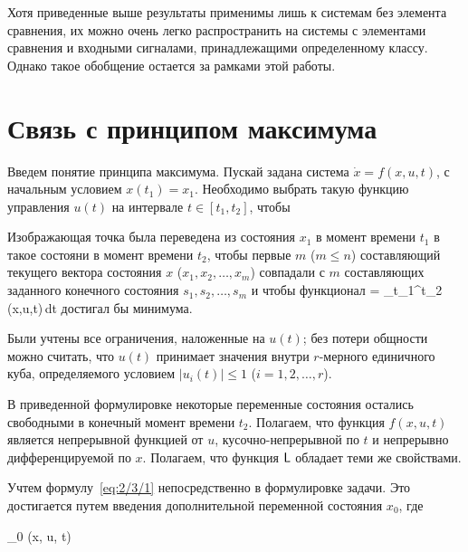 \br

Хотя приведенные выше результаты применимы лишь к системам без элемента сравнения, их можно очень легко распространить на системы с элементами сравнения и входными сигналами, принадлежащими определенному классу. Однако такое обобщение остается за рамками этой работы.



\section{Связь с принципом максимума}




Введем понятие принципа максимума. Пускай задана система $\dot{x} = f(x, u, t)$, с начальным условием $x(t_1) = x_1$. Необходимо выбрать такую функцию управления $u(t)$ на интервале $t \in [t_1, t_2]$, чтобы

\benum
	\item
		Изображающая точка была переведена из состояния $x_1$ в момент времени $t_1$ в такое состояни в момент времени $t_2$, чтобы первые $m$ ($m \leqslant n$) составляющий текущего вектора состояния $x$ ($x_1, x_2, \ldots, x_m$) совпадали с $m$ составляющих заданного конечного состояния $s_1, s_2, \ldots, s_m$ и чтобы функционал
			\funcF = \int\limits_{t_1}^{t_2} \funcL(x,u,t)\,dt
		\eeq
		достигал бы минимума.
		
	\item
		Были учтены все ограничения, наложенные на $u(t)$; без потери общности можно считать, что $u(t)$ принимает значения внутри $r$-мерного единичного куба, определяемого условием $|u_i(t)| \leqslant 1$ ($i = 1,2,\ldots,r$).
\eenum

В приведенной формулировке некоторые переменные состояния остались свободными в конечный момент времени $t_2$. Полагаем, что функция $f(x, u, t)$ является непрерывной функцией от $u$, кусочно-непрерывной по $t$ и непрерывно дифференцируемой по $x$. Полагаем, что функция $\mathsf{L}$ обладает теми же свойствами.

Учтем формулу~\ref{eq:2/3/1} непосредственно в формулировке задачи. Это достигается путем введения дополнительной переменной состояния $x_0$, где

    _0 \equiv \funcL(x, u, t) 
\eeq

